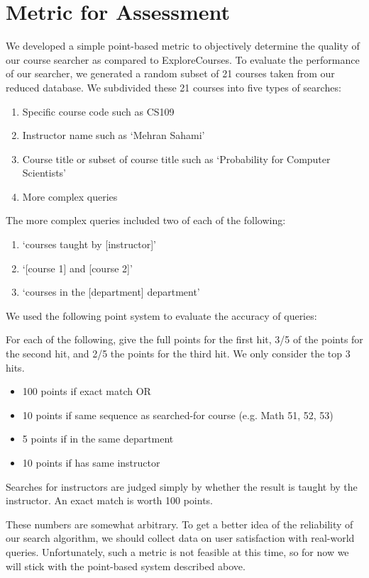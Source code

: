 \documentclass[12pt]{article}
\begin{document}
\section*{Metric for Assessment}
We developed a simple point-based metric to objectively determine the
quality of our course searcher as compared to ExploreCourses. To
evaluate the performance of our searcher, we generated a random subset
of 21 courses taken from our reduced database. We subdivided these 21
courses into five types of searches: 

\begin{enumerate}
\item Specific course code such as CS109
\item Instructor name such as `Mehran Sahami'
\item Course title or subset of course title such as `Probability for Computer Scientists'
\item More complex queries
\end{enumerate}

\noindent The more complex queries included two of each of the following: 

\begin{enumerate}
\item `courses taught by [instructor]'
\item `[course 1] and [course 2]'
\item `courses in the [department] department'
\end{enumerate}

We used the following point system to evaluate the accuracy of queries: 

For each of the following, give the full points for the first hit, 3/5
of the points for the second hit, and 2/5 the points for the third
hit. We only consider the top 3 hits.

\begin{itemize}
\item 100 points if exact match OR
\item 10 points if same sequence as searched-for course (e.g. Math 51,
  52, 53)
\item 5 points if in the same department
\item 10 points if has same instructor
\end{itemize}

Searches for instructors are judged simply by whether the result is
taught by the instructor. An exact match is worth 100 points.

These numbers are somewhat arbitrary. To get a better idea of the
reliability of our search algorithm, we should collect data on user
satisfaction with real-world queries. Unfortunately, such a metric is
not feasible at this time, so for now we will stick with the
point-based system described above.
\end{document}
